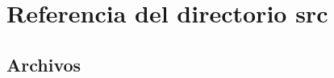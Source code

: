 \section{Referencia del directorio src}
\label{dir_68267d1309a1af8e8297ef4c3efbcdba}
\subsection*{Archivos}
\begin{DoxyCompactItemize}
\end{DoxyCompactItemize}
